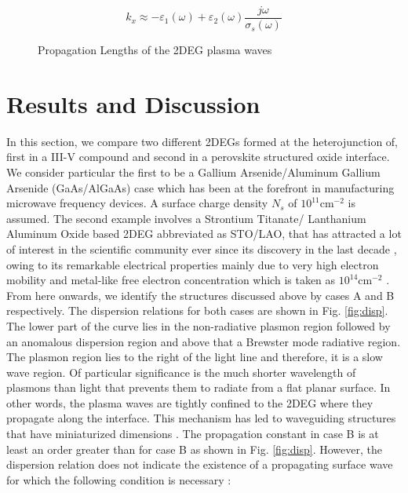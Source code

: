 \documentclass[conference, 10pt]{IEEEtran}
\renewcommand{\O}{\omega}  %
\newcommand{\E}{\varepsilon}  %
\renewcommand{\^}{\hat}  %
\begin{document}
\begin{equation}
  k_x \approx - {\E_1(\O) + \E_2(\O)} \frac{j \O}{\sigma_s(\O)}
  \label{eq:disp_diff}
\end{equation}
%
\begin{figure*}[!t]
\centering
\subfloat[Case A]{
\label{fig:pl_Ga}}
\hfil
\subfloat[Case B]{
\label{fig:pl_Sto}}
  \caption{Propagation Lengths of the 2DEG plasma waves}
\label{fig:pl}
\end{figure*}
\section{Results and Discussion}
%
In this section, we compare two different 2DEGs formed at the heterojunction of, first in a III-V compound and second in a perovskite structured oxide interface. We consider particular the first to be a Gallium Arsenide/Aluminum Gallium Arsenide (GaAs/AlGaAs) case which has been at the forefront in manufacturing microwave frequency devices. A surface charge density $N_s$ of $10^{11} \mathrm{cm}^{-2}$ is assumed. The second example involves a Strontium Titanate/ Lanthanium Aluminum Oxide based 2DEG abbreviated as STO/LAO, that has attracted a lot of interest in the scientific community ever since its discovery in the last decade \cite{ohtomo2004high}, owing to its remarkable electrical properties mainly due to very high electron mobility and metal-like free electron concentration which is taken as $10^{14} \mathrm{cm}^{-2}$ \cite{mannhart2010oxide}. From here onwards, we identify the structures discussed above by cases A and B respectively. The dispersion relations for both cases are shown in Fig. \ref{fig:disp}. The lower part of the curve lies in the non-radiative plasmon region followed by an anomalous dispersion region and above that a Brewster mode radiative region. The plasmon region lies to the right of the light line and therefore, it is a slow wave region. Of particular significance is the much shorter wavelength of plasmons than light that prevents them to radiate from a flat planar surface. In other words, the plasma waves are tightly confined to the 2DEG where they propagate along the interface. This mechanism has led to waveguiding structures that have miniaturized dimensions \cite{andress2012ultra}. The propagation constant in case B is at least an order greater than for case B as shown in Fig. \ref{fig:disp}. However, the dispersion relation does not indicate the existence of a propagating surface wave for which the following condition is necessary \cite{nevels2016optical}:
\end{document}
